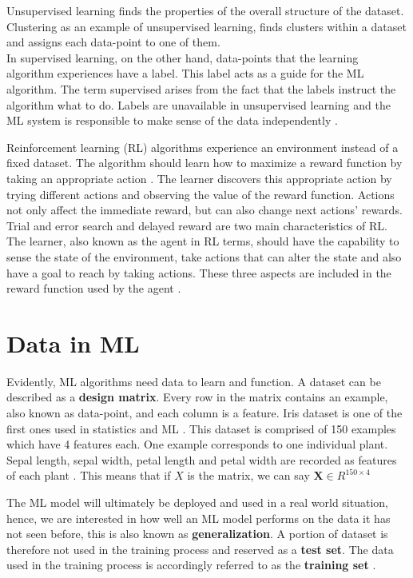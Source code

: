 Unsupervised learning finds the properties of the overall structure of the dataset. Clustering as an example of unsupervised learning, finds clusters within a dataset and assigns each data-point to one of them.\\In supervised learning, on the other hand, data-points that the learning algorithm experiences have a label. This label acts as a guide for the ML algorithm. The term supervised arises from the fact that the labels instruct the algorithm what to do. Labels are unavailable in unsupervised learning and the ML system is responsible to make sense of the data independently \cite{IanGoodfellow2016}. 

Reinforcement learning (RL) algorithms experience an environment instead of a fixed dataset. The algorithm should learn how to maximize a reward function by taking an appropriate action \cite{sutton1992introduction}. The learner discovers this appropriate action by trying different actions and observing the value of the reward function. Actions not only affect the immediate reward, but can also change next actions' rewards. Trial and error search and delayed reward are two main characteristics of RL.\\The learner, also known as the agent in RL terms, should have the capability to sense the state of the environment, take actions that can alter the state and also have a goal to reach by taking actions. These three aspects are included in the reward function used by the agent \cite{sutton1992introduction}. 

\section{Data in ML}

Evidently, ML algorithms need data to learn and function. A dataset can be described as a \textbf{design matrix}. Every row in the matrix contains an example, also known as data-point, and each column is a feature. Iris dataset is one of the first ones used in statistics and ML \cite{Fischer1936Iris}. This dataset is comprised of 150 examples which have 4 features each. One example corresponds to one individual plant. Sepal length, sepal width, petal length and petal width are recorded as features of each plant \cite{Fischer1936Iris}.
This means that if $X$ is the matrix, we can say $\mathbf{X} \in R^{150 \times 4}$

The ML model will ultimately be deployed and used in a real world situation, hence, we are interested in how well an ML model performs on the data it has not seen before, this is also known as \textbf{generalization}. A portion of dataset is therefore not used in the training process and reserved as a \textbf{test set}. The data used in the training process is accordingly referred to as the \textbf{training set} \cite{IanGoodfellow2016}. 

